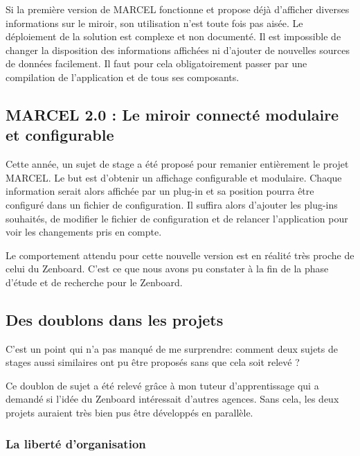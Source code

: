 
Si la première version de MARCEL fonctionne et propose déjà d'afficher diverses informations sur le miroir, son utilisation n'est toute fois pas aisée. Le déploiement de la solution est complexe et non documenté. Il est impossible de changer la disposition des informations affichées ni d'ajouter de nouvelles sources de données facilement. Il faut pour cela obligatoirement passer par une compilation de l'application et de tous ses composants.

\subsection{MARCEL 2.0 : Le miroir connecté modulaire et configurable}

Cette année, un sujet de stage a été proposé pour remanier entièrement le projet MARCEL. Le but est d'obtenir un affichage configurable et modulaire. Chaque information serait alors affichée par un plug-in et sa position pourra être configuré dans un fichier de configuration. Il suffira alors d'ajouter les plug-ins souhaités, de modifier le fichier de configuration et de relancer l'application pour voir les changements pris en compte.

Le comportement attendu pour cette nouvelle version est en réalité très proche de celui du Zenboard. C'est ce que nous avons pu constater à la fin de la phase d'étude et de recherche pour le Zenboard.

\subsection{Des doublons dans les projets}

C'est un point qui n'a pas manqué de me surprendre: comment deux sujets de stages aussi similaires ont pu être proposés sans que cela soit relevé ?

Ce doublon de sujet a été relevé grâce à mon tuteur d'apprentissage qui a demandé si l'idée du Zenboard intéressait d'autres agences. Sans cela, les deux projets auraient très bien pus être développés en parallèle.
\subsubsection{La liberté d'organisation}

